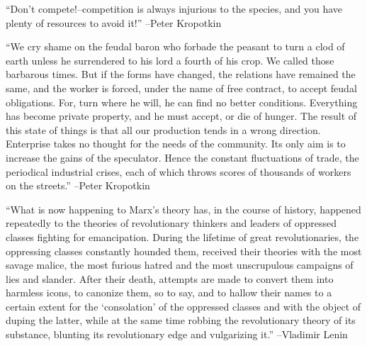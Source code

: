 \documentclass{article}%
\begin{document}
\linebreak%
\vspace{1mm}%
\begin{minipage}{\textwidth}%
\flushleft%
“Don't compete!–competition is always injurious to the species, and you have plenty of resources to avoid it!”%
\linebreak%
\vspace{1mm}%
–Peter Kropotkin%
\linebreak%
\vspace{1mm}%
\end{minipage}%
\linebreak%
\vspace{1mm}%
\begin{minipage}{\textwidth}%
\flushleft%
“We cry shame on the feudal baron who forbade the peasant to turn a clod of earth unless he surrendered to his lord a fourth of his crop. We called those barbarous times. But if the forms have changed, the relations have remained the same, and the worker is forced, under the name of free contract, to accept feudal obligations. For, turn where he will, he can find no better conditions. Everything has become private property, and he must accept, or die of hunger. The result of this state of things is that all our production tends in a wrong direction. Enterprise takes no thought for the needs of the community. Its only aim is to increase the gains of the speculator. Hence the constant fluctuations of trade, the periodical industrial crises, each of which throws scores of thousands of workers on the streets.”%
\linebreak%
\vspace{1mm}%
–Peter Kropotkin%
\linebreak%
\vspace{1mm}%
\end{minipage}%
\linebreak%
\vspace{1mm}%
\begin{minipage}{\textwidth}%
\flushleft%
“What is now happening to Marx's theory has, in the course of history, happened repeatedly to the theories of revolutionary thinkers and leaders of oppressed classes fighting for emancipation. During the lifetime of great revolutionaries, the oppressing classes constantly hounded them, received their theories with the most savage malice, the most furious hatred and the most unscrupulous campaigns of lies and slander. After their death, attempts are made to convert them into harmless icons, to canonize them, so to say, and to hallow their names to a certain extent for the ‘consolation’ of the oppressed classes and with the object of duping the latter, while at the same time robbing the revolutionary theory of its substance, blunting its revolutionary edge and vulgarizing it.”%
\linebreak%
\vspace{1mm}%
–Vladimir Lenin%
\linebreak%
\vspace{1mm}%
\end{minipage}%
\end{document}
